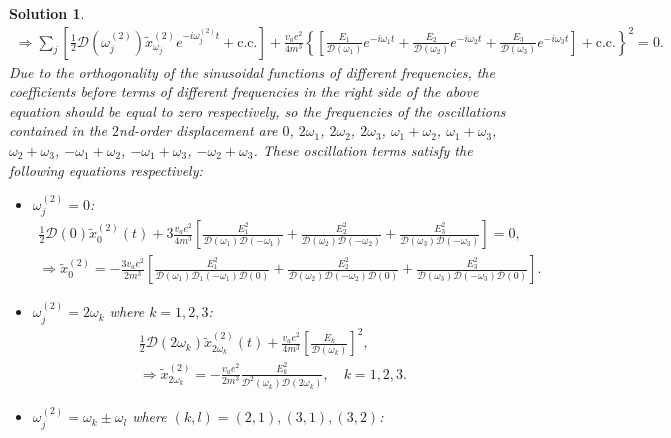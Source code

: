 \documentclass[UTF8,10pt,a4paper]{article}
\theoremstyle{Problem}
\theoremstyle{Solution}
\newtheorem*{sol}{Solution}
\begin{document}
\begin{sol}
\begin{gather}
        \Longrightarrow\sum_j\left[\frac{1}{2}\mathcal{D}(\omega_j^{(2)})\tilde{x}_{\omega_j}^{(2)}e^{-i\omega_j^{(2)}t}+\text{c.c.}\right]+\frac{v_ae^2}{4m^3}\left\{\left[\frac{E_1}{\mathcal{D}(\omega_1)}e^{-i\omega_1t}+\frac{E_2}{\mathcal{D}(\omega_2)}e^{-i\omega_2t}+\frac{E_3}{\mathcal{D}(\omega_3)}e^{-i\omega_3t}\right]+\text{c.c.}\right\}^2=0.
    \end{gather}
    Due to the orthogonality of the sinusoidal functions of different frequencies, the coefficients before terms of different frequencies in the right side of the above equation should be equal to zero respectively, so the frequencies of the oscillations contained in the $2$nd-order displacement are $0$, $2\omega_1$, $2\omega_2$, $2\omega_3$, $\omega_1+\omega_2$, $\omega_1+\omega_3$, $\omega_2+\omega_3$, $-\omega_1+\omega_2$, $-\omega_1+\omega_3$, $-\omega_2+\omega_3$. These oscillation terms satisfy the following equations respectively:
    \begin{itemize}
        \item $\omega_j^{(2)}=0$:
              \begin{gather}
                  \frac{1}{2}\mathcal{D}(0)\tilde{x}_0^{(2)}(t)+3\frac{v_ae^2}{4m^3}\left[\frac{E_1^2}{\mathcal{D}(\omega_1)\mathcal{D}(-\omega_1)}+\frac{E_2^2}{\mathcal{D}(\omega_2)\mathcal{D}(-\omega_2)}+\frac{E_3^2}{\mathcal{D}(\omega_3)\mathcal{D}(-\omega_3)}\right]=0,\\
                  \label{2nd-order-sol1}
                  \Longrightarrow\tilde{x}_0^{(2)}=-\frac{3v_ae^2}{2m^3}\left[\frac{E_1^2}{\mathcal{D}(\omega_1)\mathcal{D}_1(-\omega_1)\mathcal{D}(0)}+\frac{E_2^2}{\mathcal{D}(\omega_2)\mathcal{D}(-\omega_2)\mathcal{D}(0)}+\frac{E_3^2}{\mathcal{D}(\omega_3)\mathcal{D}(-\omega_3)\mathcal{D}(0)}\right].
              \end{gather}
        \item $\omega_j^{(2)}=2\omega_k$ where $k=1,2,3$:
              \begin{gather}
                  \frac{1}{2}\mathcal{D}(2\omega_k)\tilde{x}_{2\omega_k}^{(2)}(t)+\frac{v_ae^2}{4m^3}\left[\frac{E_k}{\mathcal{D}(\omega_k)}\right]^2,\\
                  \label{2nd-order-sol2}
                  \Longrightarrow\tilde{x}_{2\omega_k}^{(2)}=-\frac{v_ae^2}{2m^3}\frac{E_k^2}{\mathcal{D}^2(\omega_k)\mathcal{D}(2\omega_k)},\quad k=1,2,3.
              \end{gather}
        \item $\omega_j^{(2)}=\omega_k\pm\omega_l$ where $(k,l)=(2,1),(3,1),(3,2)$:

\end{itemize}
\end{sol}
\end{document}
